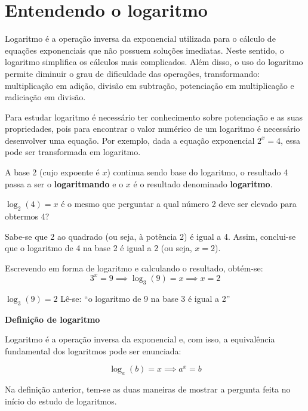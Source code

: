 \section{Entendendo o logaritmo}

Logaritmo é a operação inversa da exponencial utilizada para o cálculo de equações exponenciais que não possuem soluções imediatas. Neste sentido, o logaritmo simplifica os cálculos mais complicados. Além disso, o uso do logaritmo permite diminuir o grau de dificuldade das operações, transformando: multiplicação em adição, divisão em subtração, potenciação em multiplicação e radiciação em divisão.

Para estudar logaritmo é necessário ter conhecimento sobre potenciação e as suas propriedades, pois para encontrar o valor numérico de um logaritmo é necessário desenvolver uma equação. Por exemplo, dada a equação exponencial $2^x = 4$, essa pode ser transformada em logaritmo.

\begin{texample}
    \centering
\end{texample}
	
A base 2 (cujo expoente é $x$) continua sendo base do logaritmo, o resultado 4 passa a ser o \textbf{logaritmando} e o $x$ é o resultado denominado \textbf{logaritmo}.
	
$\log_{2}(4) = x$ é o mesmo que perguntar a qual número 2 deve ser elevado para obtermos 4?
	
Sabe-se que 2 ao quadrado (ou seja, à potência 2) é igual a 4. Assim, conclui-se que o logaritmo de 4 na base 2 é igual a 2 (ou seja, $x = 2$).
	
Escrevendo em forma de logaritmo e calculando o resultado, obtém-se:
\[
3^x = 9 \implies \log_3(9) = x \implies x = 2
\]
	
\(\log_{3}(9)= 2\) Lê-se: ``o logaritmo de 9 na base 3 é igual a 2''
	
\noindent
\textbf{Definição de logaritmo}
	
Logaritmo é a operação inversa da exponencial e, com isso, a equivalência fundamental dos logaritmos pode ser enunciada:

        \begin{tcolorbox}[colback=white,colframe=minha_cor,coltitle=black,title=Definição] 
        \[
        {\log_{a}(b) = x \implies a^x = b}
        \]
        \end{tcolorbox}
        
	Na definição anterior, tem-se as duas maneiras de mostrar a pergunta feita no início do estudo de logaritmos.
	
